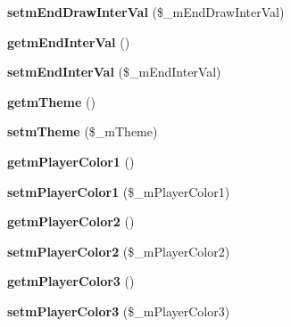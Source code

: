 \begin{DoxyCompactItemize}
{\bfseries setm\+End\+Draw\+Inter\+Val} (\$\+\_\+m\+End\+Draw\+Inter\+Val)
\item 
\mbox{\label{class_reversi_setting_ae9a3d550ba5709f511fcdc3967684816}} 
{\bfseries getm\+End\+Inter\+Val} ()
\item 
\mbox{\label{class_reversi_setting_aa1c85566dde92e56e7b81f2835d0d89e}} 
{\bfseries setm\+End\+Inter\+Val} (\$\+\_\+m\+End\+Inter\+Val)
\item 
\mbox{\label{class_reversi_setting_a4b459d4e6476f142840db591e6d61868}} 
{\bfseries getm\+Theme} ()
\item 
\mbox{\label{class_reversi_setting_a465e8f25ffb52a084c29e71768b6a0a1}} 
{\bfseries setm\+Theme} (\$\+\_\+m\+Theme)
\item 
\mbox{\label{class_reversi_setting_a091d9cd436e68f4c08d26f61fab3a016}} 
{\bfseries getm\+Player\+Color1} ()
\item 
\mbox{\label{class_reversi_setting_a411006ea8845a27f5e33b4a555254d2d}} 
{\bfseries setm\+Player\+Color1} (\$\+\_\+m\+Player\+Color1)
\item 
\mbox{\label{class_reversi_setting_ad60404de7ef938cb3c26804c07abe7f7}} 
{\bfseries getm\+Player\+Color2} ()
\item 
\mbox{\label{class_reversi_setting_a0a0e0d287c262fcc7f2fb27e0d9dbf3a}} 
{\bfseries setm\+Player\+Color2} (\$\+\_\+m\+Player\+Color2)
\item 
\mbox{\label{class_reversi_setting_aaff7ca02d82c322ed3f60b52523a77c9}} 
{\bfseries getm\+Player\+Color3} ()
\item 
\mbox{\label{class_reversi_setting_af9a10798cdece260908673d06fb6feca}} 
{\bfseries setm\+Player\+Color3} (\$\+\_\+m\+Player\+Color3)
\item 
\mbox{\label{class_reversi_setting_a1bc996495613ed975434f36c37dc53b4}} 

\end{DoxyCompactItemize}
